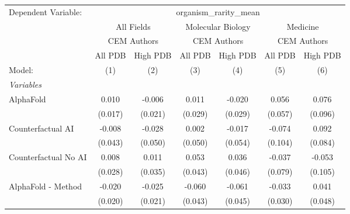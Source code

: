 \begingroup
\centering
\begin{tabular}{lcccccc}
   \tabularnewline \midrule \midrule
   Dependent Variable: & \multicolumn{6}{c}{organism\_rarity\_mean}\\
 & \multicolumn{2}{c}{All Fields} & \multicolumn{2}{c}{Molecular Biology} & \multicolumn{2}{c}{Medicine} \\
\cmidrule(lr){2-3} \cmidrule(lr){4-5} \cmidrule(lr){6-7}
 & \multicolumn{2}{c}{CEM Authors} & \multicolumn{2}{c}{CEM Authors} & \multicolumn{2}{c}{CEM Authors} \\
\cmidrule(lr){2-3} \cmidrule(lr){4-5} \cmidrule(lr){6-7}
 & \multicolumn{1}{c}{All PDB} & \multicolumn{1}{c}{High PDB} & \multicolumn{1}{c}{All PDB} & \multicolumn{1}{c}{High PDB} & \multicolumn{1}{c}{All PDB} & \multicolumn{1}{c}{High PDB} \\
\cmidrule(lr){2-2} \cmidrule(lr){3-3} \cmidrule(lr){4-4} \cmidrule(lr){5-5} \cmidrule(lr){6-6} \cmidrule(lr){7-7}
   Model:                                                     & (1)     & (2)         & (3)           & (4)           & (5)     & (6)\\  
   \midrule
   \emph{Variables}\\
   AlphaFold                                                  & 0.010   & -0.006      & 0.011         & -0.020        & 0.056   & 0.076\\   
                                                              & (0.017) & (0.021)     & (0.029)       & (0.029)       & (0.057) & (0.096)\\   
   Counterfactual AI                                          & -0.008  & -0.028      & 0.002         & -0.017        & -0.074  & 0.092\\   
                                                              & (0.043) & (0.050)     & (0.050)       & (0.054)       & (0.104) & (0.084)\\   
   Counterfactual No AI                                       & 0.008   & 0.011       & 0.053         & 0.036         & -0.037  & -0.053\\   
                                                              & (0.028) & (0.035)     & (0.043)       & (0.046)       & (0.079) & (0.105)\\   
   AlphaFold - Method                                         & -0.020  & -0.025      & -0.060        & -0.061        & -0.033  & 0.041\\   
                                                              & (0.020) & (0.021)     & (0.043)       & (0.045)       & (0.030) & (0.048)\\   

\end{tabular}
